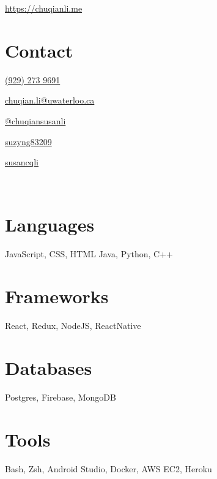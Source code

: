 \documentclass[]{friggeri-cv}
\begin{document}
       {\href{http://chuqianli.me}{https://chuqianli.me}}


\begin{aside}
  \section{Contact}
  \begin{description}\raggedleft
	  \item \href{tel:19292739691}{(929) 273 9691 \textcolor{red}{\faPhone}}
	  \item \href{mailto:chuqian.li@edu.uwaterloo.ca}{chuqian.li@uwaterloo.ca \textcolor{red}{\faEnvelopeO}}
	  \item \href{https://medium.com/@chuqiansusanli}{@chuqiansusanli \textcolor{red}{\faMedium}}
	  \item \href{https://github.com/suzyng83209}{suzyng83209 \textcolor{red}{\faGithub}}
	  \item \href{https://www.linkedin.com/in/susancqli}{susancqli \textcolor{red}{\faLinkedin}}
  \end{description}
  \
  \section{Languages}
  JavaScript, CSS, HTML
  Java, Python, C++
  \section{Frameworks}
  React, Redux, NodeJS, ReactNative
  \section{Databases}
  Postgres, Firebase, MongoDB
  \section{Tools}
  Bash, Zsh, Android Studio, Docker, AWS EC2, Heroku
  \

\end{aside}
\end{document}
